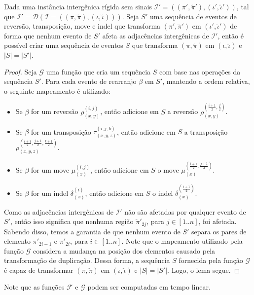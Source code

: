 \begin{lemma}\label{lemma:GTTULLOM}
Dada uma instância intergênica rígida sem sinais $\mathcal{I'}=((\pi',\breve\pi'),(\iota',\breve\iota'))$, tal que $\mathcal{I'}=\mathcal{D}(\mathcal{I}=((\pi,\breve\pi),(\iota,\breve\iota)))$. Seja $S'$ uma sequência de eventos de reversão, transposição, move e indel que transforma $(\pi',\breve\pi')$ em $(\iota',\breve\iota')$ de forma que nenhum evento de $S'$ afeta as adjacências intergênicas de $\mathcal{I'}$, então é possível criar uma sequência de eventos $S$ que transforma $(\pi,\breve\pi)$ em $(\iota,\breve\iota)$ e $|S|=|S'|$.
\end{lemma}
\begin{proof}
Seja $\mathcal{G}$ uma função que cria um sequência $S$ com base nas operações da sequência $S'$. Para cada evento de rearranjo $\beta$ em $S'$, mantendo a ordem relativa, o seguinte mapeamento é utilizado:
\begin{itemize}
  \item Se $\beta$ for um reversão $\rho^{(i,j)}_{(x,y)}$, então adicione em $S$ a reversão $\rho^{(\frac{i+1}{2},\frac{j}{2})}_{(x,y)}$.
  \item Se $\beta$ for um transposição $\tau^{(i,j,k)}_{(x,y,z)}$, então adicione em $S$ a transposição $\rho^{(\frac{i+1}{2},\frac{j+1}{2},\frac{k+1}{2})}_{(x,y,z)}$.
  \item Se $\beta$ for um move $\mu^{(i,j)}_{(x)}$, então adicione em $S$ o move $\mu^{(\frac{i+1}{2},\frac{j+1}{2})}_{(x)}$.
  \item Se $\beta$ for um indel $\delta^{(i)}_{(x)}$, então adicione em $S$ o indel $\delta^{(\frac{i+1}{2})}_{(x)}$. 
\end{itemize}
Como as adjacências intergênicas de $\mathcal{I'}$ não são afetadas por qualquer evento de $S'$, então isso significa que nenhuma região $\breve\pi'_{2j}$, para $j\in[1..n]$, foi afetada. Sabendo disso, temos a garantia de que nenhum evento de $S'$ separa os pares de elemento $\pi'_{2i-1}$ e $\pi'_{2i}$, para $i\in[1..n]$. Note que o mapeamento utilizado pela função $\mathcal{G}$ considera a mudança na posição dos elementos causado pela transformação de duplicação. Dessa forma, a sequência $S$ fornecida pela função $\mathcal{G}$ é capaz de transformar $(\pi,\breve\pi)$ em $(\iota,\breve\iota)$ e $|S|=|S'|$. Logo, o lema segue.
\end{proof}

Note que as funções $\mathcal{F}$ e $\mathcal{G}$ podem ser computadas em tempo linear.

